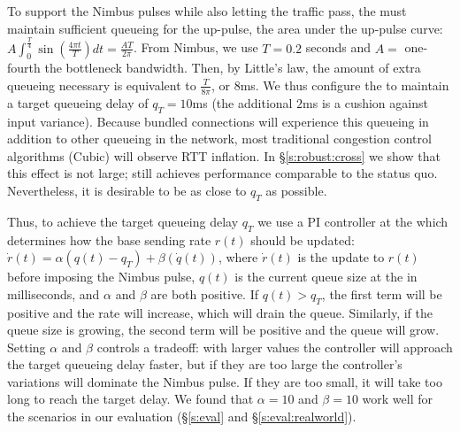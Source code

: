 To support the Nimbus pulses while also letting the traffic pass,
the \inbox must maintain sufficient queueing for the up-pulse,
\ie the area under the up-pulse curve: 
$A \int_0^{\frac{T}{4}} \sin(\frac{4\pi{}t}{T}) dt = \frac{AT}{2\pi}$.
From Nimbus, we use $T = 0.2$ seconds and $A =$ one-fourth the bottleneck bandwidth. Then, by Little's law, the amount of extra queueing necessary is equivalent to
$\frac{T}{8\pi}$, or $8$ms. %
We thus configure the \inbox to maintain a target queueing delay of $q_T = 10$ms (the additional $2$ms is a cushion against input variance).
Because bundled connections will experience this queueing in addition to other queueing in the network, 
most traditional congestion control algorithms (\eg Cubic) will observe RTT inflation. 
In \S\ref{s:robust:cross} we show that this effect is not large; \name still achieves performance comparable to the status quo. Nevertheless, it is desirable to be as close to $q_T$ as possible. 

Thus, to achieve the target queueing delay $q_T$
we use a PI controller at the \inbox which determines how the base sending rate $r(t)$ should be updated:
$\dot{r}(t) = \alpha (q(t) - q_T) + \beta (\dot{q}(t))$, where $\dot{r}(t)$ is the update to $r(t)$ before imposing the Nimbus pulse, $q(t)$ is the current queue size at the \inbox in milliseconds, and $\alpha$ and $\beta$ are both positive.
If $q(t) > q_T$, the first term will be positive and the rate will increase, which will drain the queue. Similarly, if the queue size is growing, the second term will be positive and the queue will grow. 
Setting $\alpha$ and $\beta$ controls a tradeoff: with larger values the controller will approach the target queueing delay faster, but if they are too large the controller's variations will dominate the Nimbus pulse. 
If they are too small, it will take too long to reach the target delay. 
We found that $\alpha=10$ and $\beta = 10$ work well for the scenarios in our evaluation (\S\ref{s:eval} and \S\ref{s:eval:realworld}).


